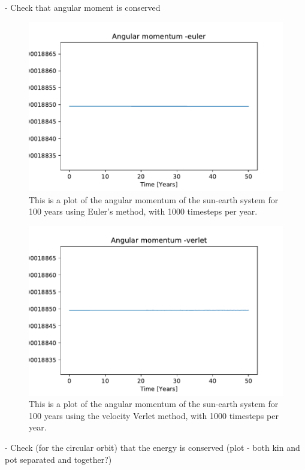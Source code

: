 	- Check that angular moment is conserved
\begin{figure}[H]
\includegraphics[width=1.1\linewidth]{../results/plots/angularmomentum-euler.pdf}\caption{This is a plot of the angular momentum of the sun-earth system for 100 years using Euler's method, with 1000 timesteps per year.}\label{fig:angluarmomentum-euler}
\end{figure}	

\begin{figure}[H]
\includegraphics[width=1.1\linewidth]{../results/plots/angularmomentum-verlet.pdf}\caption{This is a plot of the angular momentum of the sun-earth system for 100 years using the velocity Verlet method, with 1000 timesteps per year.}\label{fig:angularmomentum-verlet}
\end{figure}	
	- Check (for the circular orbit) that the energy is conserved (plot - both kin and pot separated and together?)

